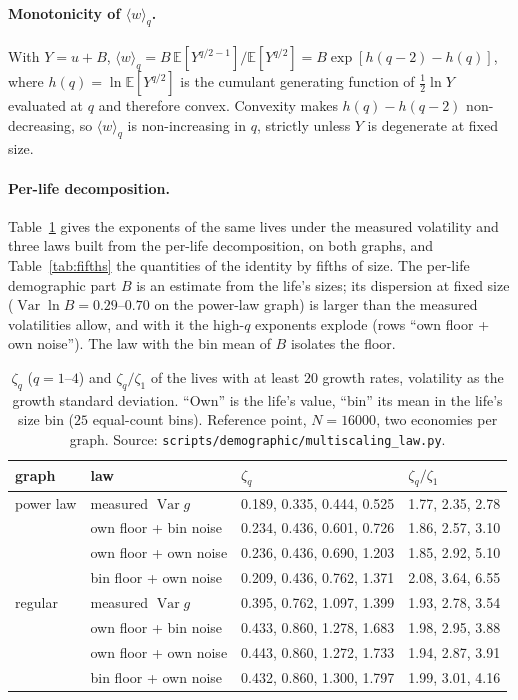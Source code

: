 \documentclass[pre,onecolumn,superscriptaddress,nofootinbib]{revtex4-2}
\newcommand{\E}{\mathbb E}
\newcommand{\Var}{\operatorname{Var}}
\begin{document}
\paragraph{Monotonicity of $\langle w\rangle_q$.}  With $Y=u+B$, $\langle w\rangle_q=B\,\E[Y^{q/2-1}]/\E[Y^{q/2}]=
B\exp[h(q-2)-h(q)]$, where $h(q)=\ln\E[Y^{q/2}]$ is the cumulant generating function of $\tfrac12\ln Y$
evaluated at $q$ and therefore convex.  Convexity makes $h(q)-h(q-2)$ non-decreasing, so $\langle w\rangle_q$ is
non-increasing in $q$, strictly unless $Y$ is degenerate at fixed size.

\paragraph{Per-life decomposition.}  Table~\ref{tab:mslaw} gives the exponents of the same lives under the
measured volatility and three laws built from the per-life decomposition, on both graphs, and
Table~\ref{tab:fifths} the quantities of the identity by fifths of size.  The per-life demographic part
$B$ is an estimate from the life's sizes; its dispersion at fixed size ($\Var\ln B=0.29$--$0.70$ on the
power-law graph) is larger than the measured volatilities allow, and with it the high-$q$ exponents
explode (rows ``own floor + own noise'').  The law with the bin mean of $B$ isolates the floor.

\begin{table}[h]
\caption{$\zeta_q$ ($q=1$--$4$) and $\zeta_q/\zeta_1$ of the lives with at least $20$ growth rates, volatility
as the growth standard deviation.  ``Own'' is the life's value, ``bin'' its mean in the life's size bin
($25$ equal-count bins).  Reference point, $N=16000$, two economies per graph.  Source:
\texttt{scripts/demographic/multiscaling\_law.py}.}
\label{tab:mslaw}
\begin{ruledtabular}
\begin{tabular}{llll}
graph & law & $\zeta_q$ & $\zeta_q/\zeta_1$\\
\hline
power law & measured $\Var g$ & 0.189, 0.335, 0.444, 0.525 & 1.77, 2.35, 2.78\\
 & own floor + bin noise & 0.234, 0.436, 0.601, 0.726 & 1.86, 2.57, 3.10\\
 & own floor + own noise & 0.236, 0.436, 0.690, 1.203 & 1.85, 2.92, 5.10\\
 & bin floor + own noise & 0.209, 0.436, 0.762, 1.371 & 2.08, 3.64, 6.55\\
regular & measured $\Var g$ & 0.395, 0.762, 1.097, 1.399 & 1.93, 2.78, 3.54\\
 & own floor + bin noise & 0.433, 0.860, 1.278, 1.683 & 1.98, 2.95, 3.88\\
 & own floor + own noise & 0.443, 0.860, 1.272, 1.733 & 1.94, 2.87, 3.91\\
 & bin floor + own noise & 0.432, 0.860, 1.300, 1.797 & 1.99, 3.01, 4.16\\
\end{tabular}
\end{ruledtabular}
\end{table}
\end{document}
